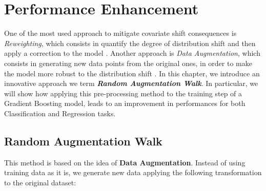 \chapter{Performance Enhancement}

One of the most used approach to mitigate covariate shift consequences is \textit{Reweighting}, which consists in quantify the degree of distribution shift and then apply a correction to the model \cite{zhang}. Another approach is \textit{Data Augmentation}, which consists in generating new data points from the original ones, in order to make the model more robust to the distribution shift \cite{zhao}. In this chapter, we introduce an innovative approach we term \textbf{\textit{Random Augmentation Walk}}. In particular, we will show how applying this pre-processing method to the training step of a Gradient Boosting model, leads to an improvement in performances for both Classification and Regression tasks.


\section{Random Augmentation Walk}

This method is based on the idea of \textbf{Data Augmentation}. Instead of using training data as it is, we generate new data applying the following transformation to the original dataset:

